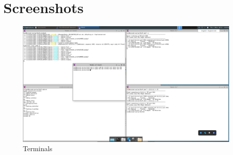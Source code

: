 \documentclass{article}
\begin{document}
\section*{Screenshots}

\begin{figure}[htp]
    \centering
    \includegraphics[width=\textwidth]{screenshot}
    \caption{Terminals}
\end{figure}
\end{document}
